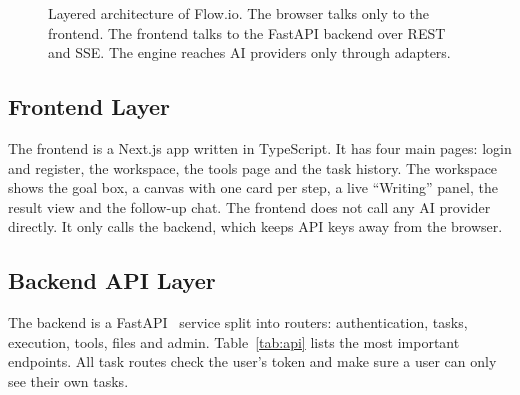 \documentclass[conference]{IEEEtran}
\begin{document}
\begin{figure}[t]
{}
\caption{Layered architecture of Flow.io. The browser talks only to the frontend. The frontend talks to
the FastAPI backend over REST and SSE. The engine reaches AI providers only through adapters.}
\label{fig:system}
\end{figure}

\subsection{Frontend Layer}
The frontend is a Next.js app written in TypeScript. It has four main pages: login and register, the
workspace, the tools page and the task history. The workspace shows the goal box, a canvas with one card
per step, a live ``Writing'' panel, the result view and the follow-up chat. The frontend does not call
any AI provider directly. It only calls the backend, which keeps API keys away from the browser.

\subsection{Backend API Layer}
The backend is a FastAPI~\cite{fastapi} service split into routers: authentication, tasks, execution,
tools, files and admin. Table~\ref{tab:api} lists the most important endpoints. All task routes check the
user's token and make sure a user can only see their own tasks.
\end{document}

